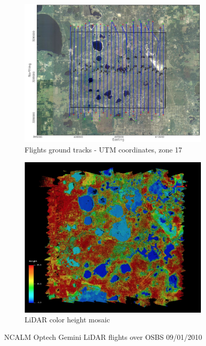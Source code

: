 \documentclass[remotesensing,article,accept,moreauthors,pdftex,12pt,a4paper]{mdpi}
\begin{document}
\begin{figure}[t]
    \centering
    \begin{subfigure}[b]{0.4\textwidth}
        \centering
        \includegraphics[width=\textwidth]{./images/NCALM_flight_ground_tracks_OSBS_9_01_10.png}
        \caption{Flights ground tracks - UTM coordinates, zone 17}
        \label{fig:JPL_AVIRIS_flight_ground_tracks_OSBS_9_4_10}
    \end{subfigure}
    \hfill
    \begin{subfigure}[b]{0.4\textwidth}
        \centering
        \includegraphics[width=\textwidth]{./images/NCALM_Optech_Gemini_LiDAR_color_height_mosaic_OSBS_9_01_10.png}
        \caption{LiDAR color height mosaic}
        \label{fig:JPL_AVIRIS_true_color_mosaic_OSBS_9_4_10}
    \end{subfigure}
    
    \caption{NCALM Optech Gemini LiDAR flights over OSBS 09/01/2010 \cite{neon2010aop}}
    \label{fig:lidar}
\end{figure}
\end{document}
